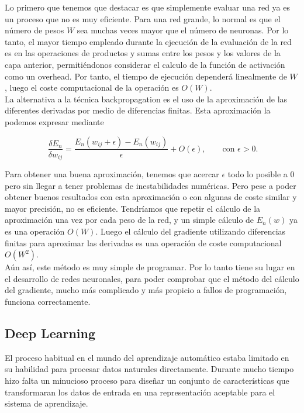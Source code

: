 Lo primero que tenemos que destacar es que simplemente evaluar una red ya es un proceso que no es muy eficiente. Para una red grande, lo normal es que el número de pesos $W$ sea muchas veces mayor que el número de neuronas. Por lo tanto, el mayor tiempo empleado durante la ejecución de la evaluación de la red es en las operaciones de productos y sumas entre los pesos y los valores de la capa anterior, permitiéndonos considerar el calculo de la función de activación como un overhead. Por tanto, el tiempo de ejecución dependerá linealmente de $W$, luego el coste computacional de la operación es $O(W)$.\\

La alternativa a la técnica backpropagation es el uso de la aproximación de las diferentes derivadas por medio de diferencias finitas. Esta aproximación la podemos expresar mediante

\[
\ \frac{\delta E_n}{\delta w_{ij}} = \frac{E_n(w_{ij}+\epsilon) - E_n(w_{ij})}{\epsilon} +O(\epsilon),\qquad\textrm{con }\epsilon>0.
\]

Para obtener una buena aproximación, tenemos que acercar $\epsilon$ todo lo posible a 0 pero sin llegar a tener problemas de inestabilidades numéricas. Pero pese a poder obtener buenos resultados con esta aproximación o con algunas de coste similar y mayor precisión, no es eficiente. Tendríamos que repetir el cálculo de la aproximación una vez por cada peso de la red, y un simple cálculo de $E_n(w)$ ya es una operación $O(W)$. Luego el cálculo del gradiente utilizando diferencias finitas para aproximar las derivadas es una operación de coste computacional $O(W^2)$.\\

Aún así, este método es muy simple de programar. Por lo tanto tiene su lugar en el desarrollo de redes neuronales, para poder comprobar que el método del cálculo del gradiente, mucho más complicado y más propicio a fallos de programación, funciona correctamente.\\

\subsection{Deep Learning}

El proceso habitual en el mundo del aprendizaje automático estaba limitado en su habilidad para procesar datos naturales directamente. Durante mucho tiempo hizo falta un minucioso proceso para diseñar un conjunto de características que transformaran los datos de entrada en una representación aceptable para el sistema de aprendizaje\cite{lecun-nature}.\\

